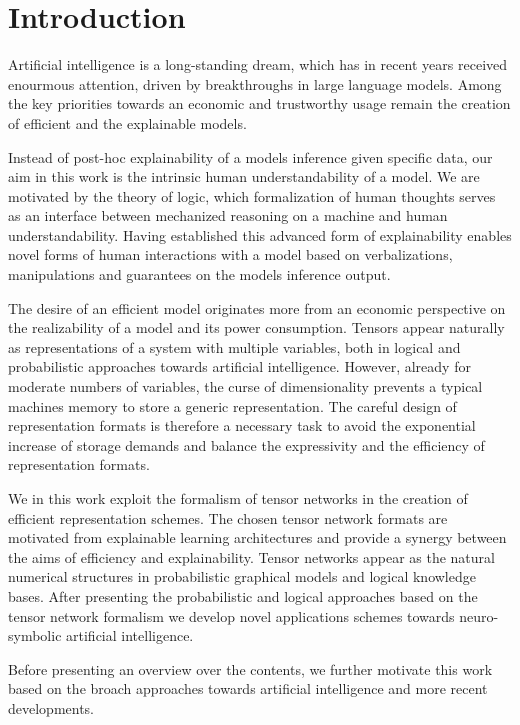 \chapter{Introduction}

Artificial intelligence is a long-standing dream, which has in recent years received enourmous attention, driven by breakthroughs in large language models.
Among the key priorities towards an economic and trustworthy usage remain the creation of efficient and the explainable models.

Instead of post-hoc explainability of a models inference given specific data, our aim in this work is the intrinsic human understandability of a model.
We are motivated by the theory of logic, which formalization of human thoughts serves as an interface between mechanized reasoning on a machine and human understandability.
Having established this advanced form of explainability enables novel forms of human interactions with a model based on verbalizations, manipulations and guarantees on the models inference output.

The desire of an efficient model originates more from an economic perspective on the realizability of a model and its power consumption.
Tensors appear naturally as representations of a system with multiple variables, both in logical and probabilistic approaches towards artificial intelligence. %
However, already for moderate numbers of variables, the curse of dimensionality prevents a typical machines memory to store a generic representation.
The careful design of representation formats is therefore a necessary task to avoid the exponential increase of storage demands and balance the expressivity and the efficiency of representation formats.

We in this work exploit the formalism of tensor networks in the creation of efficient representation schemes.
The chosen tensor network formats are motivated from explainable learning architectures and provide a synergy between the aims of efficiency and explainability.
Tensor networks appear as the natural numerical structures in probabilistic graphical models and logical knowledge bases.
After presenting the probabilistic and logical approaches based on the tensor network formalism we develop novel applications schemes towards neuro-symbolic artificial intelligence.


Before presenting an overview over the contents, we further motivate this work based on the broach approaches towards artificial intelligence and more recent developments.

